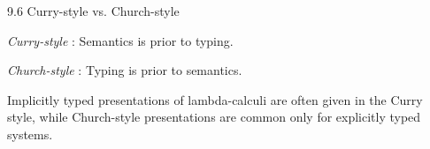 \documentclass[table]{beamer}
\begin{document}
\begin{frame}[t]{9.6 Curry-style vs. Church-style} \vspace{10pt}

{\it Curry-style} : Semantics is prior to typing.

\vspace{10pt}

{\it Church-style} : Typing is prior to semantics.

\vspace{10pt}

Implicitly typed presentations of lambda-calculi are often given in the Curry style, while Church-style presentations are common only for explicitly typed systems. 

\end{frame}
\end{document}
